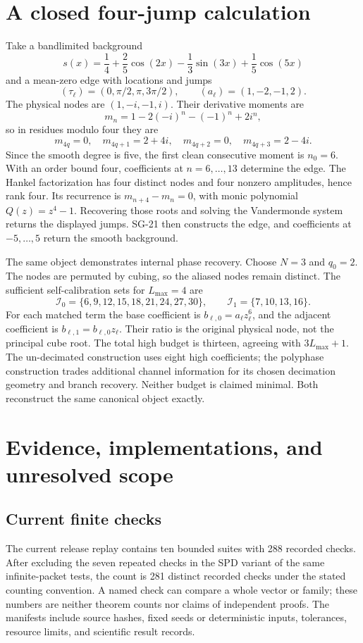 \documentclass[11pt]{article}
\theoremstyle{definition}\newtheorem{definition}[theorem]{Definition}
\theoremstyle{remark}\newtheorem{remark}[theorem]{Remark}
\begin{document}
\section{A closed four-jump calculation}

Take a bandlimited background
\[
 s(x)=\frac14+\frac25\cos(2x)-\frac13\sin(3x)+\frac15\cos(5x)
\]
and a mean-zero edge with locations and jumps
\[
 (\tau_\ell)=(0,\pi/2,\pi,3\pi/2),\qquad
 (a_\ell)=(1,-2,-1,2).
\]
The physical nodes are $(1,-i,-1,i)$. Their derivative moments are
\[
 m_n=1-2(-i)^n-(-1)^n+2i^n,
\]
so in residues modulo four they are
\[
 m_{4q}=0,\quad m_{4q+1}=2+4i,\quad
 m_{4q+2}=0,\quad m_{4q+3}=2-4i.
\]
Since the smooth degree is five, the first clean consecutive moment is
$n_0=6$. With an order bound four, coefficients at $n=6,\ldots,13$ determine
the edge. The Hankel factorization has four distinct nodes and four nonzero
amplitudes, hence rank four. Its recurrence is
$m_{n+4}-m_n=0$, with monic polynomial $Q(z)=z^4-1$.
Recovering those roots and solving the Vandermonde system returns the displayed
jumps. SG-21 then constructs the edge, and coefficients at $-5,\ldots,5$
return the smooth background.

The same object demonstrates internal phase recovery. Choose $N=3$ and
$q_0=2$. The nodes are permuted by cubing, so the aliased nodes remain distinct.
The sufficient self-calibration sets for $L_{\max}=4$ are
\[
 \mathcal I_0=\{6,9,12,15,18,21,24,27,30\},\qquad
 \mathcal I_1=\{7,10,13,16\}.
\]
For each matched term the base coefficient is
$b_{\ell,0}=a_\ell z_\ell^6$, and the adjacent coefficient is
$b_{\ell,1}=b_{\ell,0}z_\ell$. Their ratio is the original physical node,
not the principal cube root. The total high budget is thirteen, agreeing with
$3L_{\max}+1$. The un-decimated construction uses eight high coefficients;
the polyphase construction trades additional channel information for its
chosen decimation geometry and branch recovery. Neither budget is claimed
minimal. Both reconstruct the same canonical object exactly.


\section{Evidence, implementations, and unresolved scope}

\subsection{Current finite checks}
The current release replay contains ten bounded suites with 288 recorded
checks. After excluding the seven repeated checks in the SPD variant of the
same infinite-packet tests, the count is 281 distinct recorded checks under
the stated counting convention. A named check can compare a whole vector or
family; these numbers are neither theorem counts nor claims of independent
proofs. The manifests include source hashes, fixed seeds or deterministic
inputs, tolerances, resource limits, and scientific result records.
\end{document}
